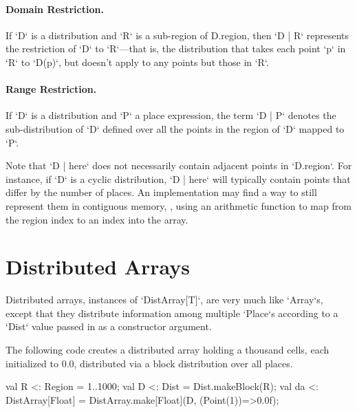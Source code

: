 \paragraph{Domain Restriction.} 

If \xcd`D` is a distribution and \xcd`R` is a sub-region of {\cf
D.region}, then \xcd`D | R` represents the restriction of \xcd`D` to
\xcd`R`---that is, the distribution that takes each point \xcd`p` in \xcd`R`
to 
\xcd`D(p)`, 
but doesn't apply to any points but those in \xcd`R`.

\paragraph{Range Restriction.}

If \xcd`D` is a distribution and \xcd`P` a place expression, the term
\xcd`D | P` 
denotes the sub-distribution of \xcd`D` defined over all the
points in the region of \xcd`D` mapped to \xcd`P`.

Note that \xcd`D | here` does not necessarily contain adjacent points
in \xcd`D.region`. For instance, if \xcd`D` is a cyclic distribution,
\xcd`D | here` will typically contain points that differ by the number of
places. 
An implementation may find a
way to still represent them in contiguous memory, \eg, using an arithmetic
function to map from the region index to an index 
into the array.


\section{Distributed Arrays}

Distributed arrays, instances of \xcd`DistArray[T]`, are very much like
\xcd`Array`s, except that they distribute information among multiple
\xcd`Place`s according to a \xcd`Dist` value passed in as a constructor
argument.  

\begin{ex}The following code creates a distributed array holding
a thousand cells, each initialized to 0.0, distributed via a block
distribution over all places.
\begin{xten}
val R <: Region = 1..1000;
val D <: Dist = Dist.makeBlock(R);
val da <: DistArray[Float] 
       = DistArray.make[Float](D, (Point(1))=>0.0f);
\end{xten}
\end{ex}



